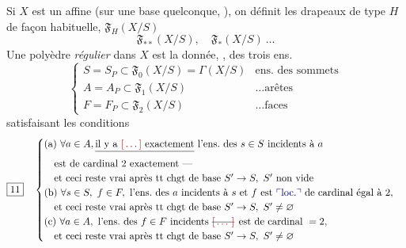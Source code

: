 \documentclass[11pt,a4paper]{article}
\begin{document}
Si $X$ est un \struck{\ill{}} \struck{\ill{}} affine   (sur une base quelconque,  \struck{\ill{}}), on  définit les drapeaux de type $H$  de façon habituelle,  $\mathfrak{F}_H(X/S)$
\[
\mathfrak{F}_{**}(X/S), \quad \mathfrak{F}_*(X/S) \ \ldots
\]
Une  polyèdre \emph{régulier}  dans $X$ est la donnée, , des trois ens.\ 
\[
\begin{cases}
S = S_P \subset \mathfrak{F}_0(X/S) = \Gamma(X/S) & \text{ens.\ des sommets} \\
A = A_P \subset \mathfrak{F}_1(X/S) & \ldots \text{arêtes} \\
F = F_P \subset \mathfrak{F}_2(X/S) & \ldots \text{faces}
\end{cases} \tag{10}
\]
satisfaisant les conditions
\[
\boxed{11}\quad
\begin{cases}
\text{(a) } \forall a \in A, \struck{\text{il y a } \ill{} \text{ exactement}} \text{ l'ens.\ des } s \in S \text{ incidents à } a \\
\quad \text{est de cardinal 2 exactement —} \\
\quad \text{et ceci reste vrai après tt chgt de base } S' \to S,\ S' \text{ non vide} \\
\text{(b) } \forall s \in S,\ f \in F, \text{ l'ens.\ des } a \text{ incidents à } s \text{ et } f \text{ est \add{loc.} de cardinal égal à } 2, \\
\quad \text{et ceci reste vrai après tt chgt de base } S' \to S,\ S' \neq \varnothing \\
\text{(c) } \forall a \in A, \text{ l'ens.\ des } f \in F \text{ incidents \struck{\ill{}} est de cardinal } = 2, \\
\quad \text{et ceci reste vrai après tt chgt de base } S' \to S,\ S' \neq \varnothing
\end{cases}
\]
\end{document}
